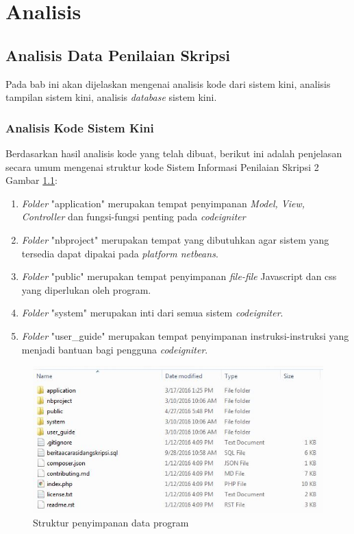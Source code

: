 \chapter{Analisis}
\label{chap: analisis}

\section{Analisis Data Penilaian Skripsi}
\label{sec: analisisData}

	Pada bab ini akan dijelaskan mengenai analisis kode dari sistem kini, analisis tampilan sistem kini, analisis \textit{database} sistem kini.
	
	\subsection{Analisis Kode Sistem Kini}
	\label{sec: analisisKode}
	
		Berdasarkan hasil analisis kode yang telah dibuat, berikut ini adalah penjelasan secara umum mengenai struktur kode Sistem Informasi Penilaian Skripsi 2 Gambar \ref{fig:strukturFile}:
		
		\begin{enumerate}
			\item \textit{Folder} "application" merupakan tempat penyimpanan \textit{Model, View, Controller} dan fungsi-fungsi penting pada \textit{codeigniter}
			\item \textit{Folder} "nbproject" merupakan tempat yang dibutuhkan agar sistem yang tersedia dapat dipakai pada \textit{platform netbeans}. 
			\item \textit{Folder} "public" merupakan tempat penyimpanan \textit{file-file} Javascript dan css yang diperlukan oleh program.
			\item \textit{Folder} "system" merupakan inti dari semua sistem \textit{codeigniter}.
			\item \textit{Folder} "user\_guide" merupakan tempat penyimpanan instruksi-instruksi yang menjadi bantuan bagi pengguna \textit{codeigniter}.
		\end{enumerate}
		
		\begin{figure}[H]
			\centering
			\includegraphics[scale= 1.0]{Gambar/strukturFile}
			\caption {Struktur penyimpanan data program}
			\label{fig:strukturFile}
		\end{figure}
		
